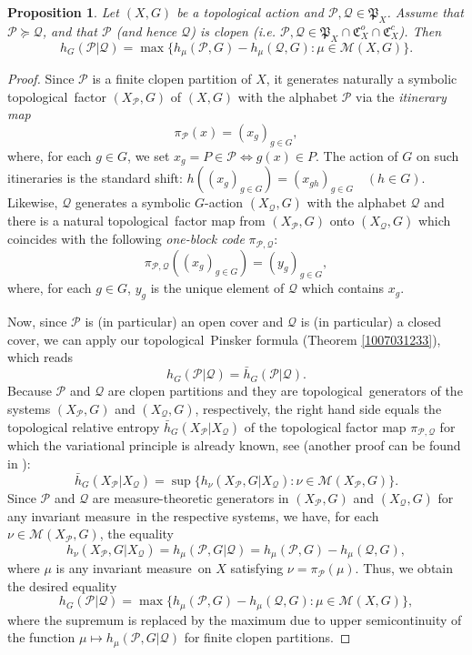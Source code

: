 \documentclass[12pt]{amsart}
\newtheorem{prop}[theorem]{Proposition}
\theoremstyle{definition}
\numberwithin{equation}{section}
\newcommand{\GC}{\mathfrak{C}}
\newcommand{\GP}{\mathfrak{P}}
\def \Q {\mathcal Q}
\def \P {\mathcal P}
\def \M {\mathcal M}
\def \tl {topological}
\def \im {invariant measure}
\def \Q {\mathcal Q}
\def \P {\mathcal P}
\def \M {\mathcal M}
\def \tl {topological}
\def \im {invariant measure}
\begin{document}
\begin{prop} \label{201505172121}
	Let $(X, G)$ be a topological action and $\mathcal{P}, \mathcal{Q}\in \GP_X$. Assume that $\mathcal{P}\succeq \mathcal{Q}$, and that $\mathcal{P}$ (and hence $\mathcal{Q}$) is clopen (i.e. $\mathcal{P}, \mathcal{Q}\in \GP_X\cap\GC^o_X\cap\GC^c_X$). Then
	\begin{equation*}
		h_G (\P|\Q)= \max \{h_\mu(\P,G)- h_\mu(\Q,G): \mu\in\M(X,G)\}.
	\end{equation*}
\end{prop}
\begin{proof}
Since $\mathcal{P}$ is a finite clopen partition of $X$, it generates naturally 
a symbolic \tl\ factor $(X_\P,G)$ of $(X,G)$ with the alphabet $\P$ via the \emph{itinerary map}
$$
\pi_\P(x) = (x_g)_{g\in G},
$$
where, for each $g\in G$, we set $x_g = P\in\P \iff g(x)\in P$. The action of $G$ on such itineraries is the standard shift: $h((x_g)_{g\in G})=(x_{gh})_{g\in G}$\ \ $(h\in G)$. Likewise, $\Q$ generates a symbolic $G$-action $(X_\Q,G)$ with the alphabet $\Q$ and there is a natural \tl\ factor map from $(X_\P,G)$ onto $(X_\Q,G)$ which coincides with the following \emph{one-block code} $\pi_{\P,\Q}$:
$$
\pi_{\P,\Q}((x_g)_{g\in G})=(y_g)_{g\in G},
$$
where, for each $g\in G$, $y_g$ is the unique element of $\Q$ which contains $x_g$.

Now, since $\P$ is (in particular) an open cover and $\Q$ is (in particular) a closed cover, we can apply our \tl\ Pinsker formula (Theorem \ref{1007031233}), which reads
$$
h_G(\P|\Q)=\bar h_G(\P|\Q).
$$
Because $\P$ and $\Q$ are clopen partitions and they are \tl\ generators of the systems $(X_\P,G)$ and $(X_\Q,G)$, respectively, the right hand side equals the topological relative entropy $\bar h_G(X_\P|X_\Q)$ of the topological factor map $\pi_{\P,\Q}$ for which the variational principle is already known, see \cite[Theorem 13.3]{DZ} (another proof can be found in \cite[Theorem 5.1]{Yan}):
$$
\bar h_G(X_\P|X_\Q) = \sup\{h_\nu (X_\P,G|X_\Q):\nu\in\M(X_\P,G)\}.
$$
Since $\P$ and $\Q$ are measure-theoretic generators in $(X_\P,G)$ and $(X_\Q,G)$ for any \im\ in the respective systems, we have, for each $\nu\in\M(X_\P,G)$, the equality
$$
h_\nu (X_\P,G|X_\Q)=h_\mu(\P,G|\Q)=h_\mu(\P,G)- h_\mu(\Q,G),
$$
where $\mu$ is any \im\ on $X$ satisfying $\nu = \pi_\P(\mu)$.
Thus, we obtain the desired equality
$$
h_G(\P|\Q)=\max \{h_\mu(\P,G)- h_\mu(\Q,G): \mu\in \mathcal{M} (X, G)\},$$
where the supremum is replaced by the maximum due to upper semicontinuity of the function
$\mu\mapsto h_\mu(\P,G|\Q)$ for finite clopen partitions.
\end{proof}
\end{document}
